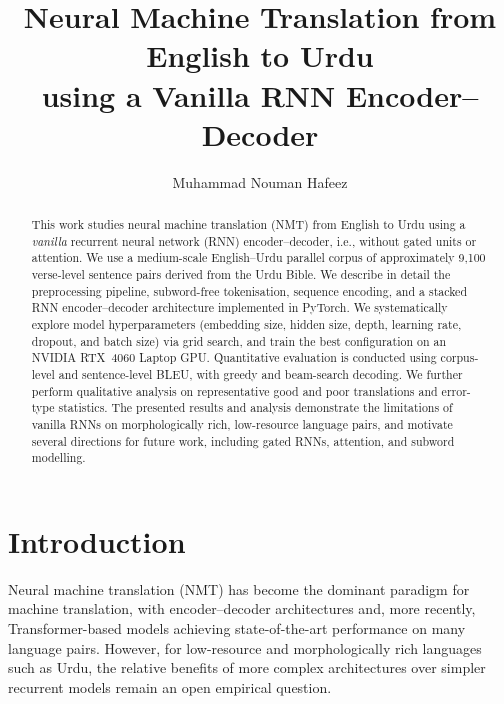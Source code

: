 \documentclass[runningheads]{llncs}
\begin{document}
\title{Neural Machine Translation from English to Urdu\\
using a Vanilla RNN Encoder--Decoder}


\author{Muhammad Nouman Hafeez}

\maketitle

\begin{abstract}
This work studies neural machine translation (NMT) from English to Urdu using a \emph{vanilla} recurrent neural network (RNN) encoder--decoder, i.e., without gated units or attention.
We use a medium-scale English--Urdu parallel corpus of approximately 9{,}100 verse-level sentence pairs derived from the Urdu Bible.
We describe in detail the preprocessing pipeline, subword-free tokenisation, sequence encoding, and a stacked RNN encoder--decoder architecture implemented in PyTorch.
We systematically explore model hyperparameters (embedding size, hidden size, depth, learning rate, dropout, and batch size) via grid search, and train the best configuration on an NVIDIA RTX~4060 Laptop GPU.
Quantitative evaluation is conducted using corpus-level and sentence-level BLEU, with greedy and beam-search decoding.
We further perform qualitative analysis on representative good and poor translations and error-type statistics.
The presented results and analysis demonstrate the limitations of vanilla RNNs on morphologically rich, low-resource language pairs, and motivate several directions for future work, including gated RNNs, attention, and subword modelling.
\end{abstract}

\section{Introduction}
Neural machine translation (NMT) has become the dominant paradigm for machine translation, with encoder--decoder architectures and, more recently, Transformer-based models achieving state-of-the-art performance on many language pairs.
However, for low-resource and morphologically rich languages such as Urdu, the relative benefits of more complex architectures over simpler recurrent models remain an open empirical question.
\end{document}
